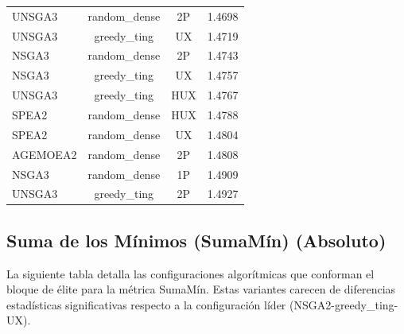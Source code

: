 \begin{longtable}{lccc}
UNSGA3 & random\_dense & 2P & 1.4698 \\
UNSGA3 & greedy\_ting & UX & 1.4719 \\
NSGA3 & random\_dense & 2P & 1.4743 \\
NSGA3 & greedy\_ting & UX & 1.4757 \\
UNSGA3 & greedy\_ting & HUX & 1.4767 \\
SPEA2 & random\_dense & HUX & 1.4788 \\
SPEA2 & random\_dense & UX & 1.4804 \\
AGEMOEA2 & random\_dense & 2P & 1.4808 \\
NSGA3 & random\_dense & 1P & 1.4909 \\
UNSGA3 & greedy\_ting & 2P & 1.4927 \\
\end{longtable}

\subsection{Suma de los Mínimos (SumaMín) (Absoluto)}\label{anexo:elite_summin}

La siguiente tabla detalla las configuraciones algorítmicas que conforman el bloque de élite para la métrica SumaMín. Estas variantes carecen de diferencias estadísticas significativas respecto a la configuración líder (NSGA2-greedy\_ting-UX).

